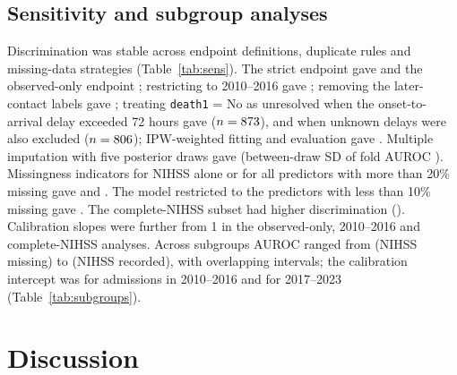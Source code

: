 \documentclass[preprint,10pt]{elsarticle}
\begin{document}
\subsection{Sensitivity and subgroup analyses}
\label{sec:sensitivity}
Discrimination was stable across endpoint definitions, duplicate rules and missing-data strategies (Table~\ref{tab:sens}). The strict endpoint gave \SensSt{} and the observed-only endpoint \SensOb; restricting to 2010--2016 gave \SensEra; removing the later-contact labels gave \SensNl; treating \texttt{death1} = No as unresolved when the onset-to-arrival delay exceeded 72 hours gave \SensOg{} ($n=873$), and \SensOu{} when unknown delays were also excluded ($n=806$); IPW-weighted fitting and evaluation gave \SensIw. Multiple imputation with five posterior draws gave \SensMi{} (between-draw SD of fold AUROC \MIdrawSD). Missingness indicators for NIHSS alone or for all \NhiMiss{} predictors with more than 20\% missing gave \SensNi{} and \SensMa. The model restricted to the \NlowMiss{} predictors with less than 10\% missing gave \SensLm. The complete-NIHSS subset had higher discrimination (\SensCn). Calibration slopes were further from 1 in the observed-only, 2010--2016 and complete-NIHSS analyses. Across subgroups AUROC ranged from \SGnihssMiss{} (NIHSS missing) to \SGnihssRec{} (NIHSS recorded), with overlapping intervals; the calibration intercept was \SGearlyInt{} for admissions in 2010--2016 and \SGlateInt{} for 2017--2023 (Table~\ref{tab:subgroups}).



\section{Discussion}
\end{document}
